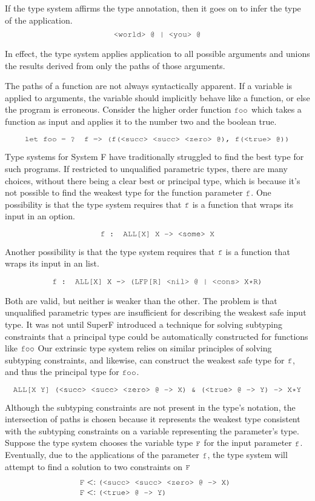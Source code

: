 \documentclass[acmsmall]{acmart}
\theoremstyle{definition}
\begin{document}
\noindent
If the type system affirms the type annotation,
then it goes on to infer the type of the application. 
\[
  \J{<world> @ | <you> @}
\]

\noindent
In effect, the type system applies application to all possible arguments
and unions the results derived from only the paths of those arguments. 

The paths of a function are not always syntactically apparent. 
If a variable is applied to arguments, the variable should implicitly behave 
like a function, or else the program is erroneous. 
Consider the higher order function $\J{foo}$ which takes a function as input
and applies it to the number two and the boolean true.

\[
  \J{let foo = ? f => (f(<succ> <succ> <zero> @), f(<true> @))}
\]

\noindent
Type systems for System F have traditionally struggled to find the best
type for such programs. If restricted to unqualified parametric types, there are many choices,
without there being a clear best or principal type, 
which is because it's not possible to find the weakest type for the function parameter
$\J{f}$.
One possibility is that the type system requires that $\J{f}$ is a function that wraps its
input in an option. 

\[
  \J{f : ALL[X] X -> <some> X}
\]

\noindent
Another possibility is that the type system requires that $\J{f}$ is a function that wraps its
input in an list. 

\[
  \J{f : ALL[X] X -> (LFP[R] <nil> @ | <cons> X*R)}
\]

\noindent
Both are valid, but neither is weaker than the other. The problem is that unqualified parametric
types are insufficient for describing the weakest safe input type.
It was not until SuperF introduced a technique for solving subtyping constraints
that a principal type could be automatically constructed for functions like $\J{foo}$
Our extrinsic type system relies on similar principles of solving subtyping constraints,
and likewise, can construct the weakest safe type for $\J{f}$, and thus the principal type for $\J{foo}$.

\[
  \J{ALL[X Y] (<succ> <succ> <zero> @ -> X) \& (<true> @ -> Y) -> X*Y}
\]

\noindent
Although the subtyping constraints are not present in the type's notation,
the intersection of paths is chosen because it represents the weakest type
consistent with the subtyping constraints on a variable representing the parameter's type. 
Suppose the type system chooses the variable type $\J{F}$ for the input parameter $\J{f}$.
Eventually, due to the applications of the parameter $\J{f}$, the type
system will attempt to find a solution to two constraints on $\J{F}$
\[
  \begin{array}[t]{@{} l}
    \J{F} \subtypes \J{(<succ> <succ> <zero> @ -> X)}
    \\
    \J{F} \subtypes \J{(<true> @ -> Y)}
  \end{array}
\]
\end{document}
